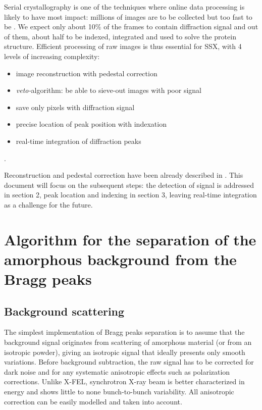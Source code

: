 \documentclass[preprint]{iucr}              %
\begin{document}
Serial crystallography is one of the techniques where online data processing is likely to have most impact:
millions of images are to be collected but too fast to be . 
We expect only about 10\% of the frames to contain diffraction signal and out of them, about half to be indexed, integrated and used to solve the protein structure.
Efficient processing of raw images is thus essential for SSX, with 4 levels of increasing complexity:
\begin{itemize}
    \item image reconstruction with pedestal correction
    \item \textit{veto-}algorithm: be able to sieve-out images with poor signal
    \item save only pixels with diffraction signal
    \item precise location of peak position with indexation %
    \item real-time integration of diffraction peaks
\end{itemize}.

Reconstruction and pedestal correction have been already described in .
This document will focus on the subsequent steps: the detection of signal is addressed in section 2, peak location and indexing in section 3, leaving real-time integration as a challenge for the future.





\section{Algorithm for the separation of the amorphous background from the Bragg peaks}
\subsection{Background scattering}
The simplest implementation of Bragg peaks separation is to assume that the background signal originates from scattering of amorphous material (or from an isotropic powder), giving an isotropic signal that ideally presents only smooth variations.
Before background subtraction, the raw signal has to be corrected for dark noise and for any systematic anisotropic effects such as polarization corrections.
Unlike X-FEL, synchrotron X-ray beam is better characterized in energy and shows little to none bunch-to-bunch variability.
All anisotropic correction can be easily modelled and taken into account.
\end{document}
